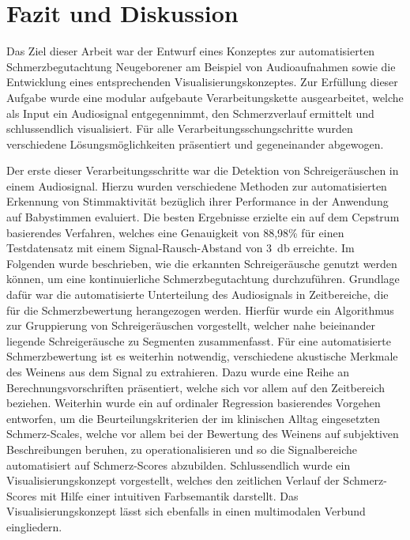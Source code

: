\chapter{Fazit und Diskussion}

Das Ziel dieser Arbeit war der Entwurf eines Konzeptes zur automatisierten Schmerzbegutachtung Neugeborener am Beispiel von Audioaufnahmen sowie die Entwicklung eines entsprechenden Visualisierungskonzeptes. Zur Erfüllung dieser Aufgabe wurde eine modular aufgebaute Verarbeitungskette ausgearbeitet, welche als Input ein Audiosignal entgegennimmt, den Schmerzverlauf ermittelt und schlussendlich visualisiert. Für alle Verarbeitungsschungschritte wurden verschiedene Lösungsmöglichkeiten präsentiert und gegeneinander abgewogen.

Der erste dieser Verarbeitungsschritte war die Detektion von Schreigeräuschen in einem Audiosignal. Hierzu wurden verschiedene Methoden zur automatisierten Erkennung von Stimmaktivität bezüglich ihrer Performance in der Anwendung auf Babystimmen evaluiert. Die besten Ergebnisse erzielte ein auf dem Cepstrum basierendes Verfahren, welches eine Genauigkeit von 88,98\% für einen Testdatensatz mit einem Signal-Rausch-Abstand von \SI{3}{\decibel} erreichte. Im Folgenden wurde beschrieben, wie die erkannten Schreigeräusche genutzt werden können, um eine kontinuierliche Schmerzbegutachtung durchzuführen. Grundlage dafür war die automatisierte Unterteilung des Audiosignals in Zeitbereiche, die für die Schmerzbewertung herangezogen werden. Hierfür wurde ein Algorithmus zur Gruppierung von Schreigeräuschen vorgestellt, welcher nahe beieinander liegende Schreigeräusche zu Segmenten zusammenfasst. Für eine automatisierte Schmerzbewertung ist es weiterhin notwendig, verschiedene akustische Merkmale des Weinens aus dem Signal zu extrahieren. Dazu wurde eine Reihe an Berechnungsvorschriften präsentiert, welche sich vor allem auf den Zeitbereich beziehen. Weiterhin wurde ein auf ordinaler Regression basierendes Vorgehen entworfen, um die Beurteilungskriterien der im klinischen Alltag eingesetzten Schmerz-Scales, welche vor allem bei der Bewertung des Weinens auf subjektiven Beschreibungen beruhen, zu operationalisieren und so die Signalbereiche automatisiert auf Schmerz-Scores abzubilden. Schlussendlich wurde ein Visualisierungskonzept vorgestellt, welches den zeitlichen Verlauf der Schmerz-Scores mit Hilfe einer intuitiven Farbsemantik darstellt. Das Visualisierungskonzept lässt sich ebenfalls in einen multimodalen Verbund eingliedern.

